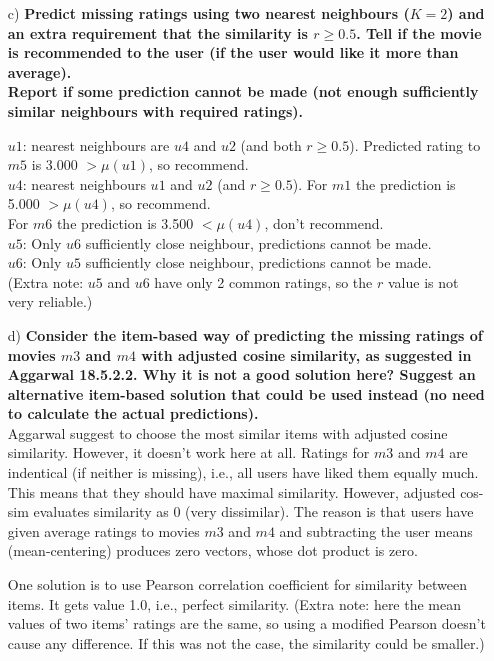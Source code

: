 \documentclass[a4paper,12pt]{article}
\begin{document}
\begin{itemize}
\item[c)] {\bf Predict missing ratings using two nearest neighbours
  ($K=2$) and an extra requirement that the similarity is $r\geq
  0.5$. Tell if the movie is recommended to the user (if the user
  would like it more than average).\\
Report if some prediction cannot be made (not enough 
sufficiently similar neighbours with required ratings).}

$u1$: nearest neighbours are $u4$ and $u2$ (and both $r\geq 
0.5$). Predicted rating to $m5$ is 3.000 $>\mu(u1)$, so recommend.\\

$u4$: nearest neighbours $u1$ and $u2$ (and $r\geq 0.5$). 
For $m1$ the prediction is 5.000 $>\mu(u4)$, so recommend.\\
For $m6$ the prediction is 3.500 $<\mu(u4)$, don't recommend.\\

$u5$: Only $u6$ sufficiently close neighbour, predictions cannot be made.\\
$u6$: Only $u5$ sufficiently close neighbour, predictions cannot be made.\\

(Extra note: $u5$ and $u6$ have only 2 common ratings, so the $r$
value is not very reliable.)\\


\item[d)] {\bf Consider the item-based way of predicting the missing ratings of
  movies $m3$ and $m4$ with adjusted cosine similarity, as suggested
  in Aggarwal 18.5.2.2. Why it is not a good solution here? Suggest an
  alternative item-based solution that could be used instead (no need
  to calculate the actual predictions).}\\

Aggarwal suggest to choose the most similar items with adjusted cosine 
similarity. However, it doesn't work here at all.  
Ratings for $m3$ and $m4$ are indentical (if neither is missing), i.e., all
users have liked them equally much. This means that they should have
maximal similarity.  However, adjusted cos-sim evaluates similarity as
0 (very dissimilar). The reason is that users have given average
ratings to movies $m3$ and $m4$ and subtracting the user means
(mean-centering) produces zero vectors, whose dot product is zero.

One solution is to use Pearson correlation coefficient for similarity
between items. It gets value 1.0, i.e., perfect similarity. (Extra
note: here the mean values of two items' ratings are the same, so
using a modified Pearson doesn't cause any difference. If this was 
not the case, the similarity could be smaller.)


\end{itemize}
\end{document}
